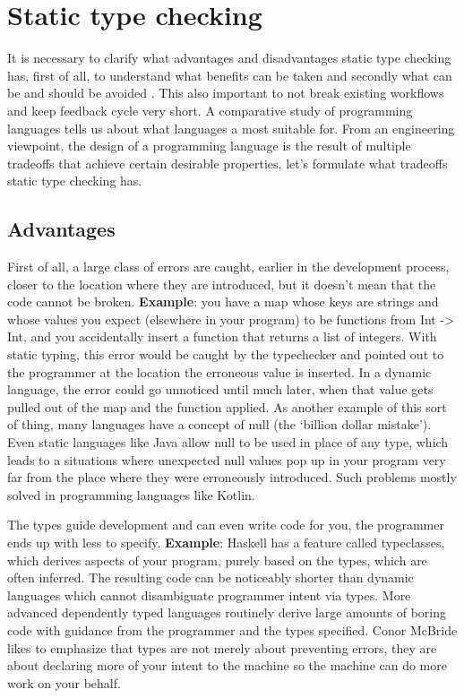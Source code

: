 \section{Static type checking}
It is necessary to clarify what advantages and disadvantages static type
checking has, first of all, to understand what benefits can be taken and
secondly what can be and should be avoided \cite{staticvsdynamic}. This also
important to not break existing workflows and keep feedback cycle very short. A
comparative study of programming languages \cite{nanz2015comparative} tells us
about what languages a most suitable for. From an engineering viewpoint, the
design of a programming language is the result of multiple tradeoffs that
achieve certain desirable properties, let's formulate what tradeoffs static type
checking has.


\subsection{Advantages}
First of all, a large class of errors are caught, earlier in the development
process, closer to the location where they are introduced, but it doesn't mean
that the code cannot be broken. \textbf{Example}: you have a map whose keys are
strings and whose values you expect (elsewhere in your program) to be functions
from Int -> Int, and you accidentally insert a function that returns a list of
integers. With static typing, this error would be caught by the typechecker and
pointed out to the programmer at the location the erroneous value is inserted.
In a dynamic language, the error could go unnoticed until much later, when that
value gets pulled out of the map and the function applied. As another example of
this sort of thing, many languages have a concept of null (the ‘billion dollar
mistake’). Even static languages like Java allow null to be used in place of any
type, which leads to a situations where unexpected null values pop up in your
program very far from the place where they were erroneously introduced. Such
problems mostly solved in programming languages like Kotlin.

The types guide development and can even write code for you, the programmer ends
up with less to specify. \textbf{Example}: Haskell has a
feature called typeclasses, which derives aspects of your program, purely based
on the types, which are often inferred. The resulting code can be noticeably
shorter than dynamic languages which cannot disambiguate programmer intent via
types. More advanced dependently typed languages routinely derive large amounts
of boring code with guidance from the programmer and the types specified. Conor
McBride likes to emphasize that types are not merely about preventing
errors, they are about declaring more of your intent to the machine so the
machine can do more work on your behalf.

